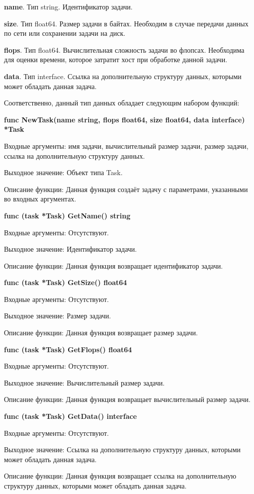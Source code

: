 \textbf{	name}. Тип  string. Идентификатор задачи.

\textbf{	size}. Тип float64. Размер задачи в байтах. Необходим в случае передачи данных по сети или сохранении задачи на диск.

\textbf{	flops}. Тип   float64. Вычислительная сложность задачи во флопсах. Необходима для оценки времени, которое затратит хост при обработке данной задачи.

\textbf{	data}. Тип interface{}. Ссылка на дополнительную структуру данных, которыми может обладать данная задача. 

Соответственно, данный тип данных обладает следующим набором функций:

\textbf{func NewTask(name string, flops float64, size float64, data interface{}) *Task}

Входные аргументы: имя задачи, вычислительный размер задачи, размер задачи, ссылка на дополнительную структуру данных.

Выходное значение: Объект типа Task.

Описание функции: Данная функция создаёт задачу с параметрами, указанными во входных аргументах.

\textbf{	func (task *Task) GetName() string }

Входные аргументы: Отсутствуют.

Выходное значение: Идентификатор задачи. 

Описание функции: Данная функция возвращает идентификатор задачи.

\textbf{	func (task *Task) GetSize() float64 }

Входные аргументы: Отсутствуют.

Выходное значение: Размер задачи.

Описание функции: Данная функция возвращает размер задачи.

\textbf{	func (task *Task) GetFlops() float64}

Входные аргументы: Отсутствуют.

Выходное значение: Вычислительный размер задачи.

Описание функции: Данная функция возвращает вычислительный размер задачи.

\textbf{	func (task *Task) GetData() interface{} }

Входные аргументы: Отсутствуют.

Выходное значение: Ссылка на дополнительную структуру данных, которыми может обладать данная задача.

Описание функции: Данная функция возвращает ссылка на дополнительную структуру данных, которыми может обладать данная задача.


